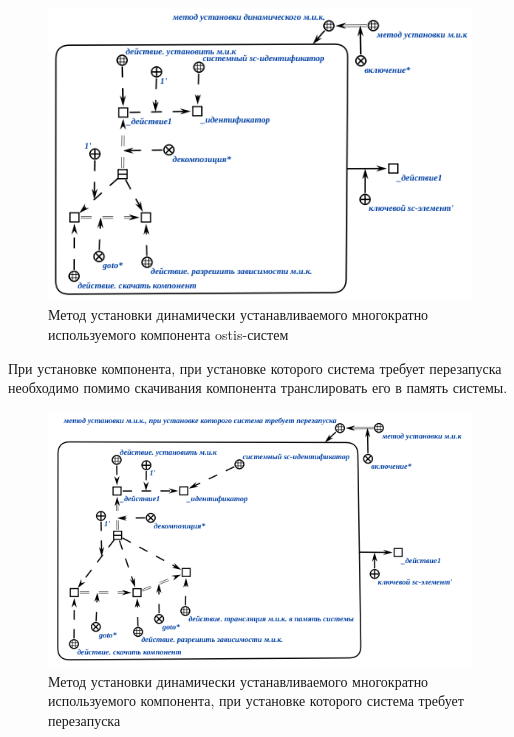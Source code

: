 \begin{figure}[H]
	\includegraphics[scale=0.8]{author/part5/figures/install_dynamic_method.png}
	\caption{Метод установки динамически устанавливаемого многократно используемого компонента ostis-систем}
	\label{fig:dynamic_method}
\end{figure}

При установке компонента, при установке которого система требует перезапуска необходимо помимо скачивания компонента транслировать его в память системы.

\begin{figure}[H]
	\includegraphics[scale=0.8]{author/part5/figures/install_with_reboot_method.png}
	\caption{Метод установки динамически устанавливаемого многократно используемого компонента, при установке которого система требует перезапуска}
	\label{fig:install_with_reboot_method}
\end{figure}


